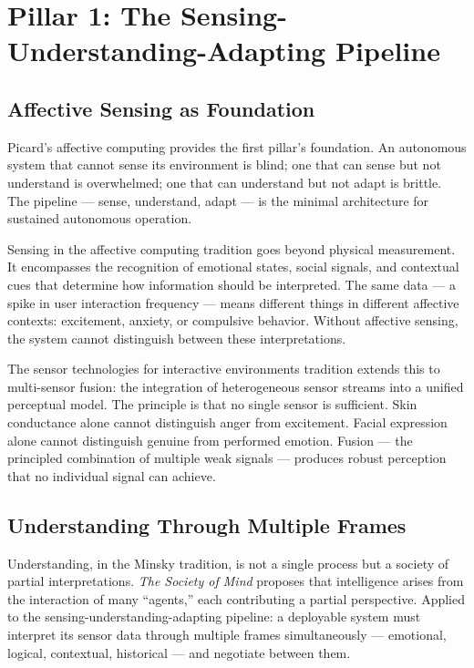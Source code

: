 \documentclass[11pt,a4paper]{article}
\begin{document}
\section{Pillar 1: The Sensing-Understanding-Adapting Pipeline}

\subsection{Affective Sensing as Foundation}

Picard's affective computing provides the first pillar's foundation. An autonomous system that cannot sense its environment is blind; one that can sense but not understand is overwhelmed; one that can understand but not adapt is brittle. The pipeline --- sense, understand, adapt --- is the minimal architecture for sustained autonomous operation.

Sensing in the affective computing tradition goes beyond physical measurement. It encompasses the recognition of emotional states, social signals, and contextual cues that determine how information should be interpreted. The same data --- a spike in user interaction frequency --- means different things in different affective contexts: excitement, anxiety, or compulsive behavior. Without affective sensing, the system cannot distinguish between these interpretations.

The sensor technologies for interactive environments tradition extends this to multi-sensor fusion: the integration of heterogeneous sensor streams into a unified perceptual model. The principle is that no single sensor is sufficient. Skin conductance alone cannot distinguish anger from excitement. Facial expression alone cannot distinguish genuine from performed emotion. Fusion --- the principled combination of multiple weak signals --- produces robust perception that no individual signal can achieve.

\subsection{Understanding Through Multiple Frames}

Understanding, in the Minsky tradition, is not a single process but a society of partial interpretations. \emph{The Society of Mind} \citep{minsky1986} proposes that intelligence arises from the interaction of many ``agents,'' each contributing a partial perspective. Applied to the sensing-understanding-adapting pipeline: a deployable system must interpret its sensor data through multiple frames simultaneously --- emotional, logical, contextual, historical --- and negotiate between them.
\end{document}
